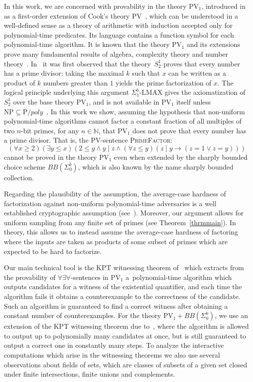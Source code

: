 \documentclass{lmcs}
\newcommand{\PV}{\text{PV}}
\newcommand{\PrimeFactor}{\textsc{PrimeFactor}}
\newcommand{\NN}{\mathbb{N}}
\begin{document}
In this work, we are concerned with provability in the theory $\PV_1$, introduced in~\cite{krajicek1991bounded} as a first-order extension of Cook's theory $\PV$~\cite{cook1975}, which can be understood in a well-defined sense as a theory of arithmetic with induction accepted only for polynomial-time predicates. Its language contains a function symbol for each polynomial-time algorithm. It is known that the theory $\PV_1$ and its extensions prove many fundamental results of algebra, complexity theory and number theory~\cite{jerabek2005weak,muller2020feasibly,jerabek2022iterated,emildual,EmilAbelian,gaysin2024proof,oliveira2025}. In~\cite{EmilAbelian} it was first observed that the theory~$S^1_2$ proves that every number has a prime divisor: taking the maximal $k$ such that $x$ can be written as a product of $k$ numbers greater than $1$ yields the prime factorization of $x$. The logical principle underlying this argument $\Sigma^b_1\text{-LMAX}$ gives the axiomatization of $S^1_2$ over the base theory $\PV_1$, and is not available in $\PV_1$ itself unless $\text{NP}\subseteq \text{P}/poly$~\cite{krajicek1991bounded}. In this work we show, assuming the hypothesis that non-uniform polynomial-time algorithms cannot factor a constant fraction of all multiples of two $n$-bit primes, for any $n\in \NN$, that $\PV_1$ does not prove that every number has a prime divisor. That is, the $\PV$-sentence \PrimeFactor:
\[(\forall x\geq 2)(\exists y\leq x)(2\leq y \land y\mid z \land (\forall z\leq y)(z\mid y\to (z =1 \lor z= y)))\]
cannot be proved in the theory $\PV_1$ even when extended by the sharply bounded choice scheme $BB(\Sigma^b_0)$, which is also known by the name sharply bounded collection. 

Regarding the plausibility of the assumption, the average-case hardness of factorization against non-uniform polynomial-time adversaries is a well established cryptographic assumption (see~\cite[Section 2.2.4]{goldreich2001foundations}). Moreover, our argument allows for uniform sampling from any finite set of primes (see Theorem~\ref{thrmmain}). In theory, this allows us to instead assume the average-case hardness of factoring where the inputs are taken as products of some subset of primes which are expected to be hard to factorize.

Our main technical tool is the KPT witnessing theorem of~\cite{krajicek1991bounded} which extracts from the provability of $\forall\exists \forall$-sentences in $\PV_1$ a~polynomial-time algorithm which outputs candidates for a witness of the existential quantifier, and each time the algorithm fails it obtains a counterexample to the correctness of the candidate. Such an algorithm is guaranteed to find a correct witness after obtaining a constant number of counterexamples. For the theory $\PV_1+BB(\Sigma^b_0)$, we use an extension of the KPT witnessing theorem due to~\cite{cookthapen2006}, where the algorithm is allowed to output up to polynomially many candidates at once, but is still guaranteed to output a correct one in constantly many steps. To analyze the interactive computations which arise in the witnessing theorems we also use several observations about fields of sets, which are classes of subsets of a given set closed under finite intersections, finite unions and complements.
\end{document}
